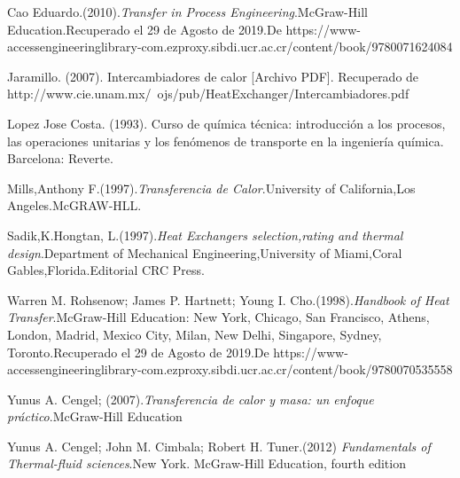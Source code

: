 \documentclass[12pt,letterpaper]{article}     %
\begin{document}
\newpage
\begin{thebibliography}{}

Cao Eduardo.(2010).\emph{Transfer in Process Engineering}.McGraw-Hill Education.Recuperado el 29 de Agosto de 2019.De https://www-accessengineeringlibrary-com.ezproxy.sibdi.ucr.ac.cr/content/book/9780071624084

Jaramillo. (2007). Intercambiadores de calor [Archivo PDF]. Recuperado de http://www.cie.unam.mx/~ojs/pub/HeatExchanger/Intercambiadores.pdf

Lopez Jose Costa. (1993). Curso de química técnica: introducción a los procesos, las operaciones unitarias y los fenómenos de transporte en la ingeniería química. Barcelona: Reverte.

Mills,Anthony F.(1997).\emph{Transferencia de Calor}.University of California,Los Angeles.McGRAW-HLL. 

Sadik,K.Hongtan, L.(1997).\emph{Heat Exchangers selection,rating and thermal design}.Department of Mechanical Engineering,University of Miami,Coral Gables,Florida.Editorial CRC Press.

Warren M. Rohsenow; James P. Hartnett; Young I. Cho.(1998).\emph{Handbook of Heat Transfer}.McGraw-Hill Education: New York, Chicago, San Francisco, Athens, London, Madrid, Mexico City, Milan, New Delhi, Singapore, Sydney, Toronto.Recuperado el 29 de Agosto de 2019.De  https://www-accessengineeringlibrary-com.ezproxy.sibdi.ucr.ac.cr/content/book/9780070535558

 Yunus A. Cengel; (2007).\emph{Transferencia de calor y masa: un enfoque práctico}.McGraw-Hill Education
 
 Yunus A. Cengel; John M. Cimbala; Robert H. Tuner.(2012) \emph{Fundamentals of Thermal-fluid sciences}.New York. McGraw-Hill Education, fourth edition


\end{thebibliography}{}


\end{document}
